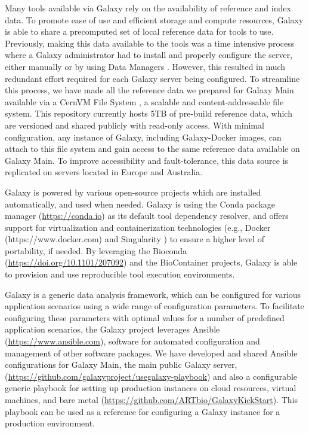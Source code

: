 Many tools available via Galaxy rely on the availability of reference and index data. To promote ease of use and efficient storage and compute resources, Galaxy is able to share a precomputed set of local reference data for tools to use. Previously, making this data available to the tools was a time intensive process where a Galaxy administrator had to install and properly configure the server, either manually or by using Data Managers \cite{blankenberg2014wrangling}. However, this resulted in much redundant effort required for each Galaxy server being configured. To streamline this process, we have made all the reference data we prepared for Galaxy Main available via a CernVM File System \cite{blomer2012status}, a scalable and content-addressable file system. This repository currently hosts 5TB of pre-build reference data, which are versioned and shared publicly with read-only access. With minimal configuration, any instance of Galaxy, including Galaxy-Docker images, can attach to this file system and gain access to the same reference data available on Galaxy Main. To improve accessibility and fault-tolerance, this data source is replicated on servers located in Europe and Australia.

Galaxy is powered by various open-source projects which are installed automatically, and used when needed. Galaxy is using the Conda package manager (\url{https://conda.io}) as its default tool dependency resolver, and offers support for virtualization and containerization technologies (e.g., Docker (https://www.docker.com) and Singularity \cite{kurtzer2017singularity}) to ensure a higher level of portability, if needed. By leveraging the Bioconda (\url{https://doi.org/10.1101/207092}) and the BioContainer \cite{da2017biocontainers} projects, Galaxy is able to provision and use reproducible tool execution environments.

Galaxy is a generic data analysis framework, which can be configured for various application scenarios using a wide range of configuration parameters. To facilitate configuring these parameters with optimal values for a number of predefined application scenarios, the Galaxy project leverages Ansible (\url{https://www.ansible.com}), software for automated configuration and management of other software packages. We have developed and shared Ansible configurations for Galaxy Main, the main public Galaxy server, (\url{https://github.com/galaxyproject/usegalaxy-playbook}) and also a configurable generic playbook for setting up production instances on cloud resources, virtual machines, and bare metal (\url{https://github.com/ARTbio/GalaxyKickStart}). This playbook can be used as a reference for configuring a Galaxy instance for a production environment.

